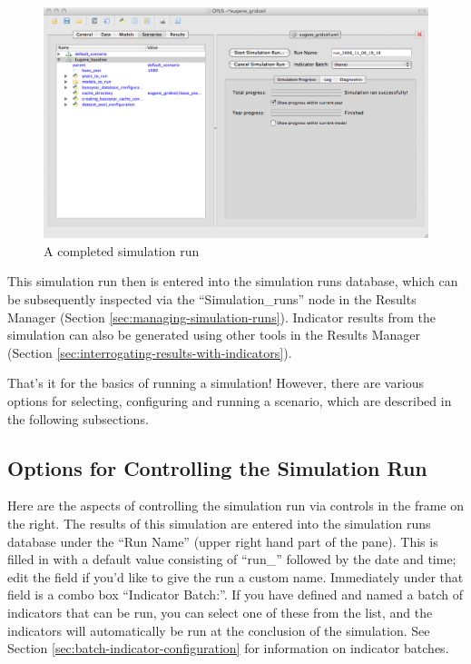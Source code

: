 \begin{figure}[htp]
\begin{center}
\includegraphics[scale=0.4]{part-gui/images/scenario-manager-completed-run.png}
\end{center}
\caption{A completed simulation run}
\label{fig:scenario-manager-completed-run}
\end{figure}

This simulation run then is entered into the simulation runs database,
which can be subsequently inspected via the ``Simulation\_runs'' node in
the Results Manager (Section \ref{sec:managing-simulation-runs}).
Indicator results from the simulation can also be generated using other
tools in the Results Manager (Section
\ref{sec:interrogating-results-with-indicators}).

That's it for the basics of running a simulation!  However, there are
various options for selecting, configuring and running a scenario, which
are described in the following subsections.

\subsection{Options for Controlling the Simulation Run}
\label{sec:controlling-simulation}

Here are the aspects of controlling the simulation run via controls in the
frame on the right.  The results of this simulation are entered into the
simulation runs database under the ``Run Name'' (upper right hand part of
the pane).  This is filled in with a default value consisting of ``run\_''
followed by the date and time; edit the field if you'd like to give the run
a custom name.  Immediately under that field is a combo box ``Indicator
Batch:''.  If you have defined and named a batch of indicators that can be
run, you can select one of these from the list, and the indicators will
automatically be run at the conclusion of the simulation.  See Section
\ref{sec:batch-indicator-configuration} for information on indicator
batches.

